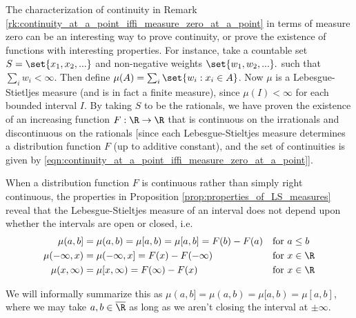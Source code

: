 \documentclass{article} %
\begin{document}
\begin{remark}
The characterization of continuity in Remark \ref{rk:continuity_at_a_point_iffi_measure_zero_at_a_point} in terms of measure zero can be an interesting way to prove continuity, or prove the existence of functions with interesting properties.   For instance, take a countable set $S = \set{x_1, x_2, ...}$ and non-negative weights $\set{w_1, w_2, ...}.$ such that $\sum_i w_i < \infty$.   Then define $\mu(A) = \sum_{i} \set{w_i : x_i \in A}$.  Now $\mu$ is a Lebesgue-Stietljes measure (and is in fact a finite measure), since $\mu(I) < \infty$ for each bounded interval $I$. By taking $S$ to be the rationals, we have proven the existence of an increasing function $F : \R \to \R$ that is continuous on the irrationals and discontinuous on the rationals {\footnotesize [since each Lebesgue-Stieltjes measure determines a distribution function $F$ (up to additive constant), and the set of continuities is given by \eqref{eqn:continuity_at_a_point_iffi_measure_zero_at_a_point}]}.
\end{remark}

\begin{remark}{}
When a distribution function $F$ is continuous rather than simply right continuous, the properties in Proposition \ref{prop:properties_of_LS_measures} reveal that the Lebesgue-Stieltjes measure of an interval does not depend upon whether the intervals are open or closed, i.e. 
\begin{subequations}
\begin{align}
\mu(a,b] &= \mu(a,b) = \mu[a,b) = \mu[a,b] = F(b)-F(a) &&  \text{for } a \leq b \\
\mu(-\infty,x) &= \mu(-\infty,x] = F(x) - F(-\infty) && \text{for } x \in \R  \\
\mu(x,\infty) &= \mu[x,\infty) = F(\infty) - F(x) && \text{for } x \in \R  
\end{align}
\label{eqn:LS_measures_with_continuous_distribution_function_dont_care_about_intervals_being_open_or_closed}
\end{subequations}

We will informally summarize this as $\mu(a,b]=\mu(a,b)=\mu[a,b)=\mu[a,b]$, where we may take $a,b \in \overline{\R}$ as long as we aren't closing the interval at $\pm \infty$.
\label{rk:LS_measures_with_continuous_distribution_function_agnostic_to_open_vs_closed_intervals}
\end{remark}
\end{document}
